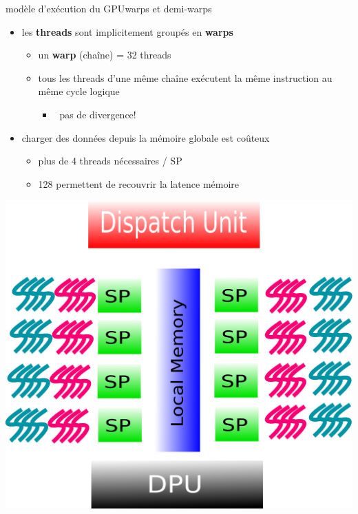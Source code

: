 \documentclass[11pt,mathserif]{beamer}
\newcommand{\kontuz}{\faExclamationTriangle\ }
\begin{document}
\begin{frame}{modèle d'exécution du GPU}{warps et demi-warps}
\begin{minipage}[c]{0.59\linewidth}
\begin{itemize}
  \item les {\bf threads} sont implicitement groupés en {\bf warps}
    \begin{itemize}
      \item un {\bf warp} (chaîne) = 32 threads 
      \item tous les threads d'une même chaîne exécutent la même instruction au même cycle logique
        \begin{itemize}
          \item \kontuz \alert{pas de divergence!}
        \end{itemize}
    \end{itemize}
  \item charger des données depuis la mémoire globale est coûteux
    \begin{itemize}
      \item plus de 4 threads nécessaires / SP
      \item 128 permettent de recouvrir la latence mémoire
    \end{itemize}
\end{itemize}
\end{minipage}
\begin{minipage}[c]{0.39\linewidth}
\begin{center}
  \includegraphics[width=0.95\linewidth]{fig/GPUArchi8ThreadDiv.eps}
\end{center}
\end{minipage}
\end{frame}
\end{document}
